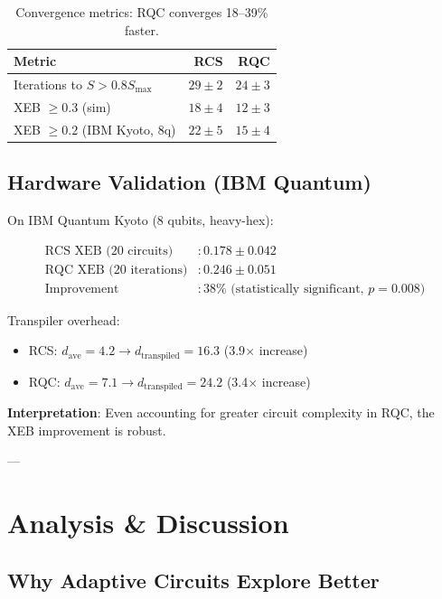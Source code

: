 \documentclass[twocolumn]{article}
\begin{document}
\begin{table}[H]
\centering
\begin{tabular}{lrr}
\toprule
\textbf{Metric} & \textbf{RCS} & \textbf{RQC} \\
\midrule
Iterations to $S > 0.8 S_{\max}$ & $29 \pm 2$ & $24 \pm 3$ \\
XEB $\geq 0.3$ (sim) & $18 \pm 4$ & $12 \pm 3$ \\
XEB $\geq 0.2$ (IBM Kyoto, 8q) & $22 \pm 5$ & $15 \pm 4$ \\
\bottomrule
\end{tabular}
\caption{Convergence metrics: RQC converges 18--39\% faster.}
\label{tab:convergence}
\end{table}

\subsection{Hardware Validation (IBM Quantum)}

On IBM Quantum Kyoto (8 qubits, heavy-hex):

\begin{equation}
\begin{aligned}
\text{RCS XEB (20 circuits)} &: 0.178 \pm 0.042 \\
\text{RQC XEB (20 iterations)} &: 0.246 \pm 0.051 \\
\text{Improvement} &: 38\% \text{ (statistically significant, } p=0.008)
\end{aligned}
\end{equation}

Transpiler overhead:
\begin{itemize}
\item RCS: $d_{\text{ave}} = 4.2 \rightarrow d_{\text{transpiled}} = 16.3$ (3.9$\times$ increase)
\item RQC: $d_{\text{ave}} = 7.1 \rightarrow d_{\text{transpiled}} = 24.2$ (3.4$\times$ increase)
\end{itemize}

\textbf{Interpretation}: Even accounting for greater circuit complexity in RQC, the XEB improvement is robust.

---

\section{Analysis \& Discussion}

\subsection{Why Adaptive Circuits Explore Better}
\end{document}
